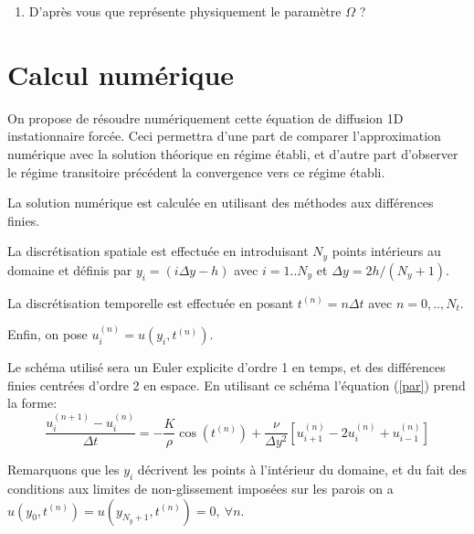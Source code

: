\documentclass[a4,12pt]{article}
\begin{document}
\begin{enumerate}
On fournit un programme \textsc{Matlab} \texttt{pulse.m} qui permet de visualiser
cette solution théorique. A l'aide de ce programme visualiser les profils de vitesse pour différentes valeurs de $\Omega$ prises dans l'intervalle $10^{-3} \leq \Omega <10^3$.

Repr\'esenter sch\'ematiquement sur votre compte-rendu la forme du profil de vitesse
à différents instants du cycle, dans les deux r\'egimes asymptotiques des grands et petits $\Omega$.
Commentez physiquement les résultats.

\item  D'apr\`es vous que repr\'esente physiquement le param\`etre $\Omega$ ? 


\end{enumerate}

\section{Calcul num\'erique}
On propose de r\'esoudre num\'eriquement cette \'equation de diffusion 
1D instationnaire forc\'ee.
Ceci permettra d'une part de comparer l'approximation numérique avec
la solution théorique en régime établi, et d'autre part d'observer
le régime transitoire précédent la convergence vers ce régime établi.

 La solution num\'erique est calcul\'ee en utilisant des m\'ethodes aux diff\'erences finies.


La discrétisation spatiale est effectuée en introduisant $N_y$ points intérieurs au domaine et définis
par $y_i = (i \Delta y -h)$ avec $i=1..N_y$ et $\Delta y = 2 h /(N_y+1)$.

La discrétisation temporelle est effectuée en posant  $t^{(n)}=n\Delta t$ avec $n=0,..,N_t$.

Enfin, on pose $u_i^{(n)} = u(y_i,t^{(n)})$.

Le sch\'ema utilis\'e sera un Euler explicite d'ordre 1 en temps, et des diff\'erences finies centr\'ees d'ordre 2 en espace.
En utilisant ce schéma l'\'equation (\ref{par}) prend la forme:
\begin{equation}
\label{disc}
\frac{u_i^{(n+1)}-u_i^{(n)}}{\Delta t}=-\frac{K}{\rho} \cos( t^{(n)} ) + \frac{\nu}{\Delta y^2} 
\left[ u_{i+1}^{(n)}-2u_i^{(n)}+u_{i-1}^{(n)} \right] 
\end{equation}
\noindent


Remarquons que les $y_i$ d\'ecrivent les points \`a l'int\'erieur du domaine, et du fait des conditions aux limites 
de non-glissement impos\'ees sur les parois on a $u(y_0,t^{(n)})=u(y_{N_y+1},t^{(n)})=0, \ \forall n$.
\end{document}
